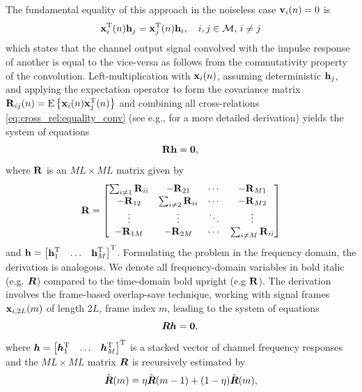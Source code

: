 \documentclass{article}
\begin{document}
The fundamental equality of this approach in the noiseless case \(\bm{\mathrm{v}}_i(n) = 0\) is 
\begin{equation}
    \bm{\mathrm{x}}_i^{{\mathrm{T}}}(n) \bm{\mathrm{h}}_j = \bm{\mathrm{x}}_j^{{\mathrm{T}}}(n) \bm{\mathrm{h}}_i,\quad i,j \in \mathcal{M},\,i\neq j\label{eq:cross_rel:equality_conv}
\end{equation}
which states that the channel output signal convolved with the impulse response of another is equal to the vice-versa as follows from the commutativity property of the convolution.
Left-multiplication with \(\bm{\mathrm{x}}_i(n)\), assuming deterministic \(\bm{\mathrm{h}}_j\), and applying the expectation operator to form the covariance matrix \(\bm{\mathrm{R}}_{ij}(n) = \mathrm{E} \left\lbrace \bm{\mathrm{x}}_i(n) \bm{\mathrm{x}}_j^{\mathrm{T}}(n) \right\rbrace\) and combining all cross-relations \eqref{eq:cross_rel:equality_conv} (see e.g., \cite{huangAdaptiveMultichannelLeast2002} for a more detailed derivation) yields the system of equations  
\begin{equation}
    \bm{\mathrm{R}} \bm{\mathrm{h}} = \bm{0}, \label{eq:cross_rel:null_space}\\
\end{equation}
where \(\bm{\mathrm{R}}\) is an \(M L \times M L\) matrix given by
\begin{equation}
    \bm{\mathrm{R}} = \begin{bmatrix}
        \sum_{i \neq 1} \bm{\mathrm{R}}_{ii} & -\bm{\mathrm{R}}_{21} & \cdots & -\bm{\mathrm{R}}_{M1}\\
        -\bm{\mathrm{R}}_{12} & \sum_{i \neq 2} \bm{\mathrm{R}}_{ii} & \cdots & -\bm{\mathrm{R}}_{M2}\\
        \vdots & \vdots & \ddots & \vdots\\
        -\bm{\mathrm{R}}_{1M} & -\bm{\mathrm{R}}_{2M} & \cdots & \sum_{i \neq M} \bm{\mathrm{R}}_{ii}\\
    \end{bmatrix}\label{eq:cross_rel:data_matrix}
\end{equation}
and \(\bm{\mathrm{h}} = \begin{bmatrix}
    \bm{\mathrm{h}}_1^{\mathrm{T}} & \ldots & \bm{\mathrm{h}}_M^{\mathrm{T}}
\end{bmatrix}^{\mathrm{T}}\).
Formulating the problem in the frequency domain, the derivation is analogous. We denote all frequency-domain variables in bold italic (e.g. \({\bm{{R}}}\)) compared to the time-domain bold upright (e.g \(\bm{\mathrm{R}}\)). The derivation involves the frame-based overlap-save technique, working with signal frames \(\bm{\mathrm{x}}_{i,2L}(m)\) of length \(2L\), frame index \(m\), leading to the system of equations 
\begin{equation}
    {\bm{{R}}} {\bm{h}} = \bm{0}, \label{eq:frequency_domain:null_space}\\
\end{equation}
where \({\bm{h}} = \begin{bmatrix}
    {\bm{h}}_1^{\mathrm{T}} & \ldots & {\bm{h}}_M^{\mathrm{T}}
\end{bmatrix}^{\mathrm{T}} \) is a stacked vector of channel frequency responses and the \(M L \times M L\) matrix \({\bm{{R}}}\) is recursively estimated by \begin{equation}
    \hat{{\bm{{R}}}}(m) = \eta \hat{{\bm{{R}}}}(m-1) + (1-\eta )\tilde{{\bm{{R}}}}(m),
\end{equation}
\end{document}
